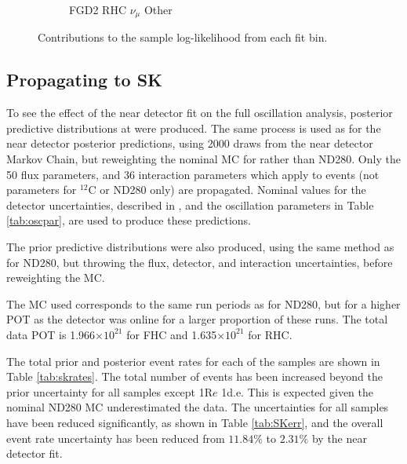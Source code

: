 \begin{figure}[!htbp]
\begin{subfigure}{.32\textwidth}
  \caption{FGD2 RHC $\nu_{\mu}$ Other}
  \label{fig:llhcont_FGD2_NuMuBkg_CCOther_in_AntiNu_Mode}
\end{subfigure}
\caption{Contributions to the sample log-likelihood from each fit bin.}
\label{fig:llhconts}
\end{figure}

\subsection{Propagating to SK}

To see the effect of the near detector fit on the full oscillation analysis, posterior predictive distributions at \SK were produced. The same process is used as for the near detector posterior predictions, using 2000 draws from the near detector Markov Chain, but reweighting the nominal MC for \SK rather than ND280. Only the 50 \SK flux parameters, and 36 interaction parameters which apply to \SK events (not parameters for $^{12}$C or ND280 only) are propagated. Nominal values for the \SK detector uncertainties, described in \cite{tn399}, and the oscillation parameters in Table \ref{tab:oscpar}, are used to produce these predictions.

The prior predictive distributions were also produced, using the same method as for ND280, but throwing the \SK flux, \SK detector, and interaction uncertainties, before reweighting the \SK MC.

The \SK MC used corresponds to the same run periods as for ND280, but for a higher POT as the detector was online for a larger proportion of these runs. The total data POT is 1.966$\times10^{21}$ for FHC and 1.635$\times10^{21}$ for RHC.

The total prior and posterior event rates for each of the \SK samples are shown in Table \ref{tab:skrates}. The total number of events has been increased beyond the prior uncertainty for all samples except 1R$e$ 1d.e. This is expected given the nominal ND280 MC underestimated the data. The uncertainties for all samples have been reduced significantly, as shown in Table \ref{tab:SKerr}, and the overall event rate uncertainty has been reduced from $11.84\%$ to $2.31\%$ by the near detector fit. 

